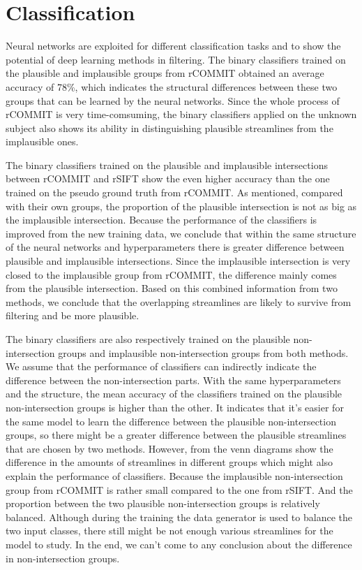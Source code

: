 \section{Classification}

Neural networks are exploited for different classification tasks and to show the potential of deep learning methods in filtering.
The binary classifiers trained on the plausible and implausible groups from rCOMMIT obtained an average accuracy of 78\%, which indicates the 
structural differences between these two groups that can be learned by the neural networks. Since the whole process of rCOMMIT is very time-comsuming,
the binary classifiers applied on the unknown subject also shows its ability in distinguishing plausible streamlines from the implausible ones.

The binary classifiers trained on the plausible and implausible intersections between rCOMMIT and rSIFT show the even higher accuracy than
the one trained on the pseudo ground truth from rCOMMIT. As mentioned, compared with their own groups, the proportion of the plausible intersection is not as big as the 
implausible intersection. Because the performance of the classifiers is improved from the new training data, we conclude that within the same
structure of the neural networks and hyperparameters there is greater difference between plausible and implausible intersections.
Since the implausible intersection is very closed to the implausible group from rCOMMIT, the difference mainly comes from the plausible intersection.
Based on this combined information from two methods, we conclude that the overlapping streamlines are likely to survive from filtering and be more plausible.


The binary classifiers are also respectively trained on the plausible non-intersection groups and implausible non-intersection groups from both methods.
We assume that the performance of classifiers can indirectly indicate the difference between the non-intersection parts.
With the same hyperparameters and the structure, 
the mean accuracy of the classifiers trained on the plausible non-intersection groups is higher than the other.
It indicates that it's easier for the same model to learn the difference between the plausible non-intersection groups,
so there might be a greater difference between the plausible streamlines that are chosen by two methods.
However, from the venn diagrams show the difference in the amounts of streamlines in different groups which might
also explain the performance of classifiers. 
Because the implausible non-intersection group from rCOMMIT is rather small compared to the one from rSIFT.
And the proportion between the two plausible non-intersection groups is relatively balanced.
Although during the training the data generator is used to balance the two input classes, there still
might be not enough various streamlines for the model to study. 
In the end, we can't come to any conclusion about the difference in non-intersection groups.


